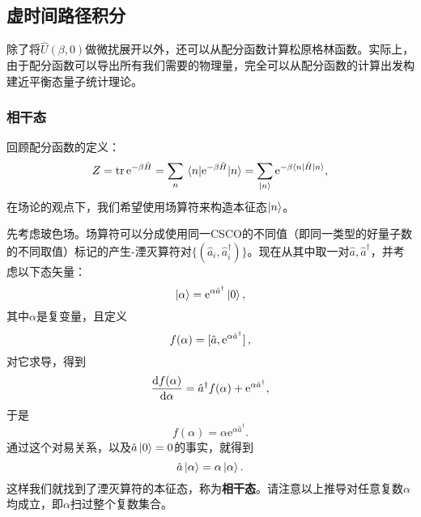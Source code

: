 \documentclass[hyperref, UTF8, a4paper]{ctexart}
\newcommand*{\ee}{\mathrm{e}}
\begin{document}
\subsection{虚时间路径积分}

除了将$\hat{U}(\beta, 0)$做微扰展开以外，还可以从配分函数计算松原格林函数。实际上，由于配分函数可以导出所有我们需要的物理量，完全可以从配分函数的计算出发构建近平衡态量子统计理论。

\subsubsection{相干态}

回顾配分函数的定义：
\[
    Z = \trace \ee^{- \beta \hat{H}} = \sum_n \mel{n}{\ee^{ - \beta \hat{H}}}{n} = \sum_{\ket{n}} \ee^{ -\beta \mel{n}{\hat{H}}{n}},
\]
在场论的观点下，我们希望使用场算符来构造本征态$\ket{n}$。

先考虑玻色场。场算符可以分成使用同一CSCO的不同值（即同一类型的好量子数的不同取值）标记的产生-湮灭算符对$\{(\hat{a}_i, \hat{a}_i^\dagger)\}$。现在从其中取一对$\hat{a}, \hat{a}^\dagger$，并考虑以下态矢量：
\begin{equation}
    \ket{\alpha} = \ee^{\alpha \hat{a}^\dagger} \ket{0},
\end{equation}
其中$\alpha$是复变量，且定义
\[
    f(\alpha) = \comm*{\hat{a}}{\ee^{\alpha \hat{a}^\dagger}},
\]
对它求导，得到
\[
    \dv{f(\alpha)}{\alpha} = \hat{a}^\dagger f(\alpha) + \ee^{\alpha \hat{a}^\dagger},
\]
于是
\[
    f(\alpha) = \alpha \ee^{\alpha \hat{a}^\dagger}.
\]
通过这个对易关系，以及$\hat{a}\ket{0} = 0$的事实，就得到
\[
    \hat{a} \ket{\alpha} = \alpha \ket{\alpha}.
\]
这样我们就找到了湮灭算符的本征态，称为\textbf{相干态}。请注意以上推导对任意复数$\alpha$均成立，即$\alpha$扫过整个复数集合。
\end{document}
